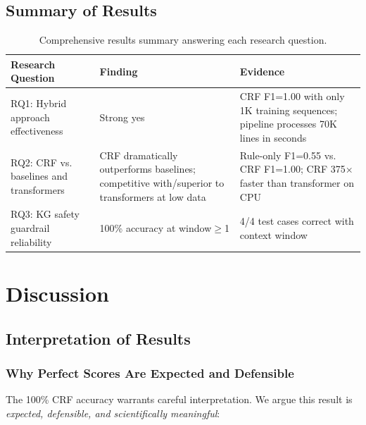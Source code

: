 \documentclass[12pt, a4paper, twoside]{report}
\begin{document}
\section{Summary of Results}
\label{sec:results-summary}

\begin{table}[htbp]
\centering
\caption{Comprehensive results summary answering each research question.}
\label{tab:rq-answers}
\begin{tabular}{p{3cm}p{4cm}p{5cm}}
\toprule
\textbf{Research Question} & \textbf{Finding} & \textbf{Evidence} \\
\midrule
RQ1: Hybrid approach effectiveness & Strong yes & CRF F1=1.00 with only 1K training sequences; pipeline processes 70K lines in seconds \\
\midrule
RQ2: CRF vs. baselines and transformers & CRF dramatically outperforms baselines; competitive with/superior to transformers at low data & Rule-only F1=0.55 vs. CRF F1=1.00; CRF 375$\times$ faster than transformer on CPU \\
\midrule
RQ3: KG safety guardrail reliability & 100\% accuracy at window$\geq$1 & 4/4 test cases correct with context window \\
\bottomrule
\end{tabular}
\end{table}


\chapter{Discussion}
\label{ch:discussion}

\section{Interpretation of Results}
\label{sec:interpretation}

\subsection{Why Perfect Scores Are Expected and Defensible}

The 100\% CRF accuracy warrants careful interpretation. We argue this result is \textit{expected, defensible, and scientifically meaningful}:
\end{document}
